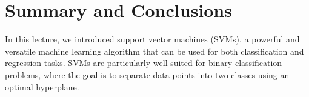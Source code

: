 \documentclass{article}[11pt]
\begin{document}
\section{Summary and Conclusions}
In this lecture, we introduced support vector machines (SVMs), a powerful and versatile machine learning algorithm that can be used for both classification and regression tasks.
SVMs are particularly well-suited for binary classification problems, where the goal is to separate data points into two classes using an optimal hyperplane.


\end{document}
